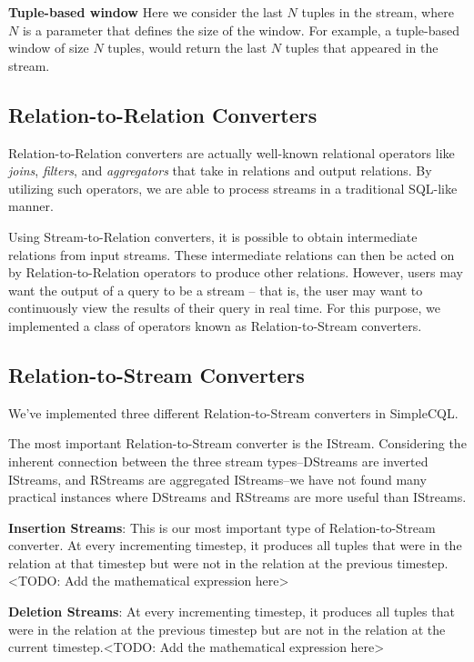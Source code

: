 \documentclass[a4paper, 10pt, conference]{IEEEconf}
\begin{document}
\textbf{Tuple-based window} Here we consider the last $N$ tuples in the stream, where $N$ is a parameter that defines the size of the window. For example, a tuple-based window of size $N$ tuples, would return the last $N$ tuples that appeared in the stream.

\subsection{Relation-to-Relation Converters}

Relation-to-Relation converters are actually well-known relational operators like \textit{joins}, \textit{filters}, and \textit{aggregators} that take in relations and output relations. By utilizing such operators, we are able to process streams in a traditional SQL-like manner.

Using Stream-to-Relation converters, it is possible to obtain intermediate relations from input streams. These intermediate relations can then be acted on by Relation-to-Relation operators to produce other relations. However, users may want the output of a query to be a stream -- that is, the user may want to continuously view the results of their query in real time. For this purpose, we implemented a class of operators known as Relation-to-Stream converters.

\subsection{Relation-to-Stream Converters}
We’ve implemented three different Relation-to-Stream converters in SimpleCQL.

The most important Relation-to-Stream converter is the IStream. Considering the inherent connection between the three stream types--DStreams are inverted IStreams, and RStreams are aggregated IStreams--we have not found many practical instances where DStreams and RStreams are more useful than IStreams.


\textbf{Insertion Streams}: This is our most important type of Relation-to-Stream converter. At every incrementing timestep, it produces all tuples that were in the relation at that timestep but were not in the relation at the previous timestep.<TODO: Add the mathematical expression here>

\textbf{Deletion Streams}: At every incrementing timestep, it produces all tuples that were in the relation at the previous timestep but are not in the relation at the current timestep.<TODO: Add the mathematical expression here>
\end{document}
